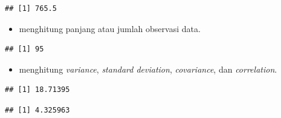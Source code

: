 \documentclass[
  12pt,
  a4paper,
]{scrbook}
\newenvironment{Shaded}{\begin{snugshade}}{\end{snugshade}}
\newcommand{\CommentTok}[1]{\textcolor[rgb]{0.56,0.35,0.01}{\textit{#1}}}
\newcommand{\KeywordTok}[1]{\textcolor[rgb]{0.13,0.29,0.53}{\textbf{#1}}}
\newcommand{\NormalTok}[1]{#1}
\newcommand{\OperatorTok}[1]{\textcolor[rgb]{0.81,0.36,0.00}{\textbf{#1}}}
\providecommand{\tightlist}{%
  \setlength{\itemsep}{0pt}\setlength{\parskip}{0pt}}
\begin{document}
\begin{verbatim}
## [1] 765.5
\end{verbatim}

\newpage

\begin{itemize}
\tightlist
\item
  menghitung panjang atau jumlah observasi data.
\end{itemize}

\begin{Shaded}
\end{Shaded}

\begin{verbatim}
## [1] 95
\end{verbatim}

\begin{itemize}
\tightlist
\item
  menghitung \emph{variance}, \emph{standard deviation},
  \emph{covariance}, dan \emph{correlation}.
\end{itemize}

\begin{Shaded}
\end{Shaded}

\begin{verbatim}
## [1] 18.71395
\end{verbatim}

\begin{Shaded}
\end{Shaded}

\begin{verbatim}
## [1] 4.325963
\end{verbatim}

\begin{Shaded}
\end{Shaded}
\end{document}
